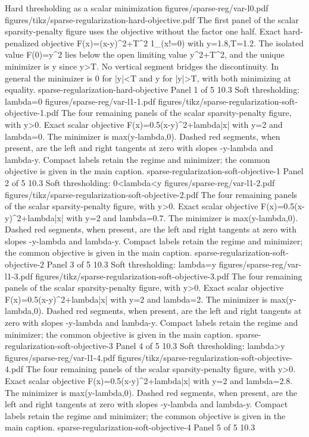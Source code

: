 {Hard thresholding as a scalar minimization}
{figures/sparse-reg/var-l0.pdf}
{figures/tikz/sparse-regularization-hard-objective.pdf}
{The first panel of the scalar sparsity-penalty figure uses the objective without the factor one half.}
{Exact hard-penalized objective F(x)=(x-y)\textasciicircum{}2+T\textasciicircum{}2 1\_(x!=0) with y=1.8,T=1.2. The isolated value F(0)=y\textasciicircum{}2 lies below the open limiting value y\textasciicircum{}2+T\textasciicircum{}2, and the unique minimizer is y since y>T. No vertical segment bridges the discontinuity. In general the minimizer is 0 for |y|<T and y for |y|>T, with both minimizing at equality.}
{sparse-regularization-hard-objective}
{Panel 1 of 5}
{10.3}
{Soft thresholding: lambda=0}
{figures/sparse-reg/var-l1-1.pdf}
{figures/tikz/sparse-regularization-soft-objective-1.pdf}
{The four remaining panels of the scalar sparsity-penalty figure, with y>0.}
{Exact scalar objective F(x)=0.5(x-y)\textasciicircum{}2+lambda|x| with y=2 and lambda=0. The minimizer is max(y-lambda,0). Dashed red segments, when present, are the left and right tangents at zero with slopes -y-lambda and lambda-y. Compact labels retain the regime and minimizer; the common objective is given in the main caption.}
{sparse-regularization-soft-objective-1}
{Panel 2 of 5}
{10.3}
{Soft thresholding: 0<lambda<y}
{figures/sparse-reg/var-l1-2.pdf}
{figures/tikz/sparse-regularization-soft-objective-2.pdf}
{The four remaining panels of the scalar sparsity-penalty figure, with y>0.}
{Exact scalar objective F(x)=0.5(x-y)\textasciicircum{}2+lambda|x| with y=2 and lambda=0.7. The minimizer is max(y-lambda,0). Dashed red segments, when present, are the left and right tangents at zero with slopes -y-lambda and lambda-y. Compact labels retain the regime and minimizer; the common objective is given in the main caption.}
{sparse-regularization-soft-objective-2}
{Panel 3 of 5}
{10.3}
{Soft thresholding: lambda=y}
{figures/sparse-reg/var-l1-3.pdf}
{figures/tikz/sparse-regularization-soft-objective-3.pdf}
{The four remaining panels of the scalar sparsity-penalty figure, with y>0.}
{Exact scalar objective F(x)=0.5(x-y)\textasciicircum{}2+lambda|x| with y=2 and lambda=2. The minimizer is max(y-lambda,0). Dashed red segments, when present, are the left and right tangents at zero with slopes -y-lambda and lambda-y. Compact labels retain the regime and minimizer; the common objective is given in the main caption.}
{sparse-regularization-soft-objective-3}
{Panel 4 of 5}
{10.3}
{Soft thresholding: lambda>y}
{figures/sparse-reg/var-l1-4.pdf}
{figures/tikz/sparse-regularization-soft-objective-4.pdf}
{The four remaining panels of the scalar sparsity-penalty figure, with y>0.}
{Exact scalar objective F(x)=0.5(x-y)\textasciicircum{}2+lambda|x| with y=2 and lambda=2.8. The minimizer is max(y-lambda,0). Dashed red segments, when present, are the left and right tangents at zero with slopes -y-lambda and lambda-y. Compact labels retain the regime and minimizer; the common objective is given in the main caption.}
{sparse-regularization-soft-objective-4}
{Panel 5 of 5}
{10.3}
